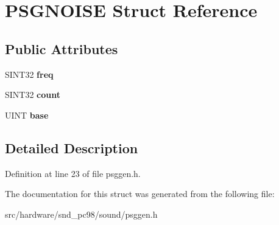 \hypertarget{structPSGNOISE}{\section{P\-S\-G\-N\-O\-I\-S\-E Struct Reference}
\label{structPSGNOISE}
}
\subsection*{Public Attributes}
\begin{DoxyCompactItemize}
\item 
\hypertarget{structPSGNOISE_ae2771329116b22dccb88026421c357cc}{S\-I\-N\-T32 {\bfseries freq}}\label{structPSGNOISE_ae2771329116b22dccb88026421c357cc}

\item 
\hypertarget{structPSGNOISE_ad2ce813c45c227b49cb89ae010dc1726}{S\-I\-N\-T32 {\bfseries count}}\label{structPSGNOISE_ad2ce813c45c227b49cb89ae010dc1726}

\item 
\hypertarget{structPSGNOISE_a5ac7745cafc825c6b6e0a97b08ed3a3c}{U\-I\-N\-T {\bfseries base}}\label{structPSGNOISE_a5ac7745cafc825c6b6e0a97b08ed3a3c}

\end{DoxyCompactItemize}


\subsection{Detailed Description}


Definition at line 23 of file psggen.\-h.



The documentation for this struct was generated from the following file\-:\begin{DoxyCompactItemize}
\item 
src/hardware/snd\-\_\-pc98/sound/psggen.\-h\end{DoxyCompactItemize}
